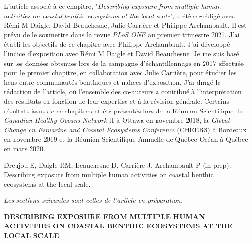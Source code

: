 L'article associé à ce chapitre, "\textit{Describing exposure from multiple human activities on coastal benthic ecosystems at the local scale}", a été co-rédigé avec Rémi M Daigle, David Beauchesne, Julie Carrière et Philippe Archambault. Il est prévu de le soumettre dans la revue \textit{PLoS ONE} au premier trimestre 2021. J'ai établi les objectifs de ce chapitre avec Philippe Archambault. J'ai développé l'indice d'exposition avec Rémi M Daigle et David Beauchesne. Je me suis basé sur les données obtenues lors de la campagne d'échantillonnage en 2017 effectuée pour le premier chapitre, en collaboration avec Julie Carrière, pour étudier les liens entre communautés benthiques et indices d'exposition. J'ai dirigé la rédaction de l'article, où l'ensemble des co-auteurs a contribué à l'interprétation des résultats en fonction de leur expertise et à la révision générale. Certains résultats issus de ce chapitre ont été présentés lors de la Réunion Scientifique du \textit{Canadian Healthy Oceans Network} II à Ottawa en novembre 2018, la \textit{Global Change on Estuarine and Coastal Ecosystems Conference} (CHEERS) à Bordeaux en novembre 2019 et la Réunion Scientifique Annuelle de Québec-Océan à Québec en mars 2020. \linebreak[4]

\begin{singlespace}
Dreujou E, Daigle RM, Beauchesne D, Carrière J, Archambault P (in prep). Describing exposure from multiple human activities on coastal benthic ecosystems at the local scale.
\end{singlespace}

\textit{Les sections suivantes sont celles de l'article en préparation.}

\clearpage

\begin{center}
\textbf{DESCRIBING EXPOSURE FROM MULTIPLE HUMAN ACTIVITIES ON COASTAL BENTHIC ECOSYSTEMS AT THE LOCAL SCALE}
\end{center}
